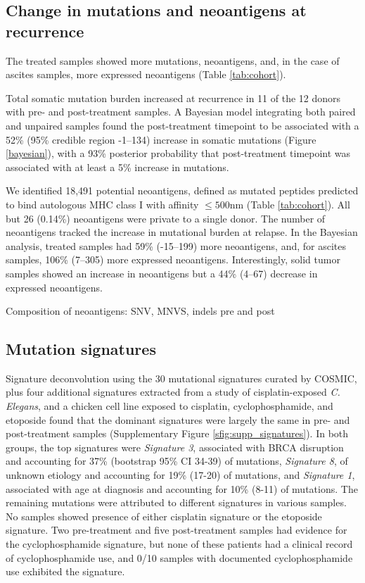 \subsection*{Change in mutations and neoantigens at recurrence}
The treated samples showed more mutations, neoantigens, and, in the case of ascites samples, more expressed neoantigens (Table \ref{tab:cohort}).

Total somatic mutation burden increased at recurrence in 11 of the 12 donors with pre- and post-treatment samples. A Bayesian model integrating both paired and unpaired samples found the post-treatment timepoint to be associated with a 52\% (95\% credible region -1--134) increase in somatic mutations (Figure \ref{bayesian}), with a 93\% posterior probability that post-treatment timepoint was associated with at least a 5\% increase in mutations. 

We identified 18,491 potential neoantigens, defined as mutated peptides predicted to bind autologous MHC class I with affinity $\leq 500$nm (Table \ref{tab:cohort}). All but 26 (0.14\%) neoantigens were private to a single donor. The number of neoantigens tracked the increase in mutational burden at relapse. In the Bayesian analysis, treated samples had 59\% (-15--199) more neoantigens, and, for ascites samples, 106\% (7--305) more expressed neoantigens. Interestingly, solid tumor samples showed an increase in neoantigens but a 44\% (4--67) decrease in expressed neoantigens.

Composition of neoantigens: SNV, MNVS, indels pre and post


\subsection*{Mutation signatures}
Signature deconvolution using the 30 mutational signatures curated by COSMIC\cite{364242}, plus four additional signatures extracted from a study of cisplatin-exposed \textit{C. Elegans}\cite{Meier_2014}, and a chicken cell line exposed to cisplatin, cyclophosphamide, and etoposide\cite{Szikriszt_2016} found that the dominant signatures were largely the same in pre- and post-treatment samples (Supplementary Figure \ref{sfig:supp_signatures}). In both groups, the top signatures were \textit{Signature 3}, associated with BRCA disruption and accounting for 37\% (bootstrap 95\% CI 34-39) of mutations, \textit{Signature 8}, of unknown etiology and accounting for 19\% (17-20) of mutations, and \textit{Signature 1}, associated with age at diagnosis and accounting for 10\% (8-11) of mutations. The remaining mutations were attributed to different signatures in various samples. No samples showed presence of either cisplatin signature or the etoposide signature. Two pre-treatment and five post-treatment samples had evidence for the cyclophosphamide signature, but none of these patients had a clinical record of cyclophosphamide use, and 0/10 samples with documented cyclophosphamide use exhibited the signature.

